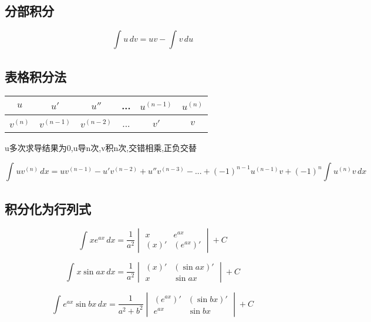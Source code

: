 \subsection{分部积分}

\begin{displaymath}
\int_{}^{} u \,dv
= uv -
\int_{}^{} v \,du
\end{displaymath}


\subsection{表格积分法}

\begin{center}
\begin{tabular}{ c|c|c|c|c|c }
\(u\) & \(u'\) & \(u''\) & ... & \(u^{(n-1)}\) & \(u^{(n)}\) \\ 
\hline
\(v^{(n)}\) & \(v^{(n-1)}\) & \(v^{(n-2)}\) & ... & \(v'\) & \(v\)
\end{tabular}
\end{center}
u多次求导结果为0,u导n次,v积n次,交错相乘,正负交替

\begin{displaymath}
\int_{}^{} uv^{(n)} \,dx
= uv^{(n-1)} - u'v^{(n - 2)} + u''v^{(n - 3)} - ...
+(-1)^{n-1}u^{(n-1)}v + (-1)^{n}
\int_{}^{} u^{(n)}v \,dx
\end{displaymath}


\subsection{积分化为行列式}

\begin{displaymath}
\int_{}^{} xe^{ax} \,dx = 
\frac{1}{a^2}
\begin{vmatrix}
  x & e^{ax}\\ 
  (x)' & (e^{ax})'
\end{vmatrix}
+ C
\end{displaymath}

\begin{displaymath}
\int_{}^{} x\sin ax \,dx 
= \frac{1}{a^2}
\begin{vmatrix}
  (x)' & (\sin ax)' \\ 
  x & \sin ax
\end{vmatrix}
+ C
\end{displaymath}

\begin{displaymath}
\int_{}^{} e^{ax}\sin bx \,dx 
= \frac{1}{a^2 + b^2}
\begin{vmatrix}
  (e^{ax})' & (\sin bx)' \\ 
  e^{ax} & \sin bx
\end{vmatrix}
+ C
\end{displaymath}

